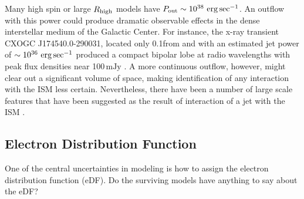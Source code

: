 Many high spin or large $R_\mathrm{high}$ models have $P_\mathrm{out} \sim 10^{38} \,\,\mathrm{erg}\,\mathrm{sec}^{-1}$.
An outflow with this power could produce dramatic observable effects in the dense interstellar medium of the Galactic Center.  For instance, the x-ray transient CXOGC J174540.0-290031, located only 0.1\pc from \sgra and with an estimated jet power of $\sim 10^{36}\,\,\mathrm{erg}\,\mathrm{sec}^{-1}$ produced a compact bipolar lobe at radio wavelengths with peak flux densities near 100$\,\mathrm{mJy}$ \citep{2005ApJ...633..218B}.  A more continuous  outflow, however, might clear out a significant volume of space, making identification of any interaction with the ISM less certain.  Nevertheless, there have been a number of large scale features that have been suggested as the result of interaction of a jet with the ISM \citep[e.g.,][]{2013ApJ...779..154L,2021ApJ...922..254C}.


\subsection{Electron Distribution Function}

One of the central uncertainties in modeling \sgra is how to assign the electron distribution function (eDF).  Do the surviving models have anything to say about the eDF?

